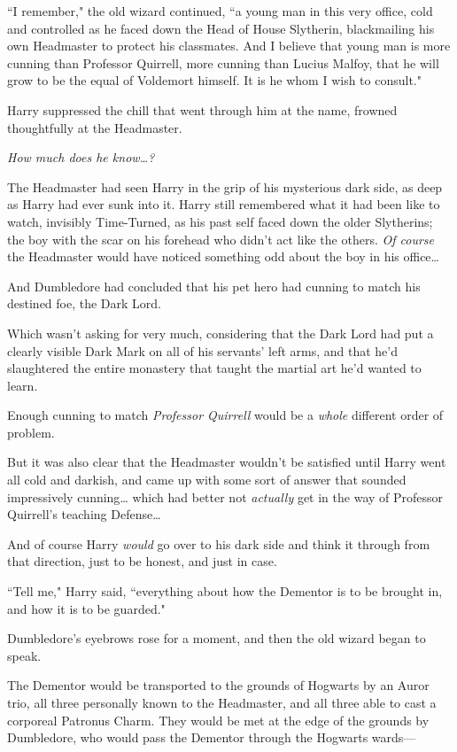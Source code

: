 ``I remember," the old wizard continued, ``a young man in this very office, cold and controlled as he faced down the Head of House Slytherin, blackmailing his own Headmaster to protect his classmates. And I believe that young man is more cunning than Professor Quirrell, more cunning than Lucius Malfoy, that he will grow to be the equal of Voldemort himself. It is he whom I wish to consult."

Harry suppressed the chill that went through him at the name, frowned thoughtfully at the Headmaster.

\emph{How much does he know{\ldots}?}

The Headmaster had seen Harry in the grip of his mysterious dark side, as deep as Harry had ever sunk into it. Harry still remembered what it had been like to watch, invisibly Time-Turned, as his past self faced down the older Slytherins; the boy with the scar on his forehead who didn't act like the others. \emph{Of course} the Headmaster would have noticed something odd about the boy in his office{\ldots}

And Dumbledore had concluded that his pet hero had cunning to match his destined foe, the Dark Lord.

Which wasn't asking for very much, considering that the Dark Lord had put a clearly visible Dark Mark on all of his servants' left arms, and that he'd slaughtered the entire monastery that taught the martial art he'd wanted to learn.

Enough cunning to match \emph{Professor Quirrell} would be a \emph{whole} different order of problem.

But it was also clear that the Headmaster wouldn't be satisfied until Harry went all cold and darkish, and came up with some sort of answer that sounded impressively cunning{\ldots} which had better not \emph{actually} get in the way of Professor Quirrell's teaching Defense{\ldots}

And of course Harry \emph{would} go over to his dark side and think it through from that direction, just to be honest, and just in case.

``Tell me," Harry said, ``everything about how the Dementor is to be brought in, and how it is to be guarded."

Dumbledore's eyebrows rose for a moment, and then the old wizard began to speak.

The Dementor would be transported to the grounds of Hogwarts by an Auror trio, all three personally known to the Headmaster, and all three able to cast a corporeal Patronus Charm. They would be met at the edge of the grounds by Dumbledore, who would pass the Dementor through the Hogwarts wards—

